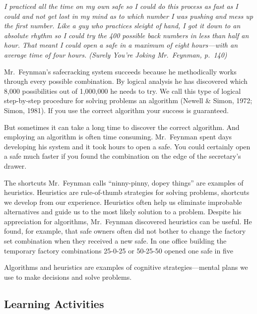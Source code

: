 \documentclass[
]{book}
\begin{document}
\emph{I practiced all the time on my own safe so I could do this process as fast as I could and not get lost in my mind as to which number I was pushing and mess up the first number. Like a guy who practices sleight of hand, I got it down to an absolute rhythm so I could try the 400 possible back numbers in less than half an hour. That meant I could open a safe in a maximum of eight hours---with an average time of four hours. (Surely You're Joking Mr.~Feynman, p.~140)}

Mr.~Feynman's safecracking system succeeds because he methodically works through every possible combination. By logical analysis he has discovered which 8,000 possibilities out of 1,000,000 he needs to try. We call this type of logical step-by-step procedure for solving problems an algorithm (Newell \& Simon, 1972; Simon, 1981). If you use the correct algorithm your success is guaranteed.

But sometimes it can take a long time to discover the correct algorithm. And employing an algorithm is often time consuming. Mr.~Feynman spent days developing his system and it took hours to open a safe. You could certainly open a safe much faster if you found the combination on the edge of the secretary's drawer.

The shortcuts Mr.~Feynman calls ``ninny-pinny, dopey things'' are examples of heuristics. Heuristics are rule-of-thumb strategies for solving problems, shortcuts we develop from our experience. Heuristics often help us eliminate improbable alternatives and guide us to the most likely solution to a problem. Despite his appreciation for algorithms, Mr.~Feynman discovered heuristics can be useful. He found, for example, that safe owners often did not bother to change the factory set combination when they received a new safe. In one office building the temporary factory combinations 25-0-25 or 50-25-50 opened one safe in five

Algorithms and heuristics are examples of cognitive strategies---mental plans we use to make decisions and solve problems.

\hypertarget{learning-activities-1}{%
\subsection*{Learning Activities}\label{learning-activities-1}}
\end{document}
